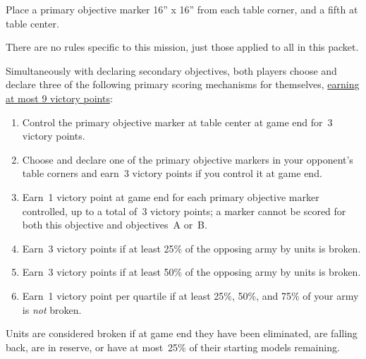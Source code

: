 
\begin{tablesetup}

  \dawnofwar

  \smallskip%
  Place a primary objective marker 16'' x 16'' from each table corner,
  and a fifth at table center.

\end{tablesetup}

\begin{missionrules}

  \bigskip%
  There are no rules specific to this mission, just those applied to
  all in this packet.

\end{missionrules}

\begin{scoring}  
\begin{primaries}
  Simultaneously with declaring secondary objectives, both players
  choose and declare three of the following primary scoring mechanisms
  for themselves, \underline{earning at most 9 victory points}:

  \begin{enumerate}[label=\Alph*.]\shortlist
  \item Control the primary objective marker at table center at game
    end for~3 victory points.

  \item Choose and declare one of the primary objective markers in
    your opponent's table corners and earn~3 victory points if you
    control it at game end.

  \item Earn~1 victory point at game end for each primary objective
    marker controlled, up to a total of~3 victory points; a marker
    cannot be scored for both this objective and objectives~A or~B.

  \item Earn~3 victory points if at least 25\% of the opposing army by
    units is broken.

  \item Earn~3 victory points if at least 50\% of the opposing army by
    units is broken.

  \item Earn~1 victory point per quartile if at least 25\%, 50\%, and
    75\% of your army is \emph{not} broken.
  \end{enumerate}

  Units are considered broken if at game end they have been
  eliminated, are falling back, are in reserve, or have at most~25\%
  of their starting models remaining.
\end{primaries}

\begin{secondaries}
\assassination
\meatgrinder
\reconnaissance
\breachpoints
\end{secondaries}

\end{scoring}
